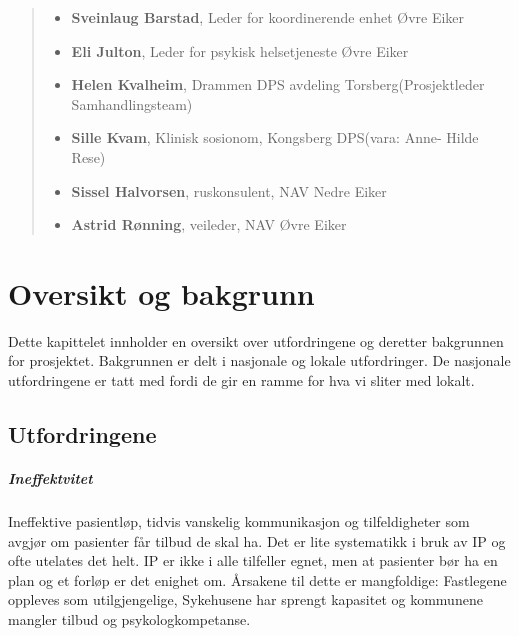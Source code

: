 \documentclass[11pt]{report} %
\begin{document}
\begin{abstract}
\begin{itemize}
                \item \textbf{Sveinlaug Barstad}, Leder for koordinerende enhet Øvre Eiker\\
                \item \textbf{Eli Julton}, Leder for psykisk helsetjeneste Øvre Eiker\\
                \item \textbf{Helen Kvalheim}, Drammen DPS avdeling Torsberg(Prosjektleder Samhandlingsteam)\\
                \item \textbf{Sille Kvam}, Klinisk sosionom, Kongsberg DPS(vara: Anne- Hilde Rese)\\
                \item \textbf{Sissel Halvorsen}, ruskonsulent, NAV Nedre Eiker\\
                \item \textbf{Astrid Rønning}, veileder, NAV Øvre Eiker\\
              \end{itemize}

              \end{abstract}

              \renewcommand{\partname}{Del}
              \renewcommand{\chaptername}{Del}
              \renewcommand{\contentsname}{Innhold}
              \renewcommand\listfigurename{Illustrasjoner}
              \renewcommand\tablename{Tabell}
		          \renewcommand\listtablename{Tabeller}
              \renewcommand{\figurename}{Illustrasjon}
              \renewcommand{\bibname}{Kilder:}

              \tableofcontents

              \chapter{Oversikt og bakgrunn}\label{chap:ov}
                Dette kapittelet innholder en oversikt over utfordringene og deretter bakgrunnen for prosjektet. Bakgrunnen er delt i nasjonale og lokale utfordringer. De nasjonale utfordringene er tatt med fordi de gir en ramme for hva vi sliter med lokalt.
                \section{Utfordringene}\label{sec:ov_utf}
                  \paragraph{Ineffektvitet\\}
                   Ineffektive pasientløp, tidvis vanskelig kommunikasjon og tilfeldigheter som avgjør om pasienter får tilbud de skal ha. Det er lite systematikk i bruk av IP og ofte utelates det helt. IP er ikke i alle tilfeller egnet, men at pasienter bør ha en plan og et forløp er det enighet om. Årsakene til dette er mangfoldige: Fastlegene oppleves som utilgjengelige, Sykehusene har sprengt kapasitet og kommunene mangler tilbud og psykologkompetanse. \\
\end{document}
